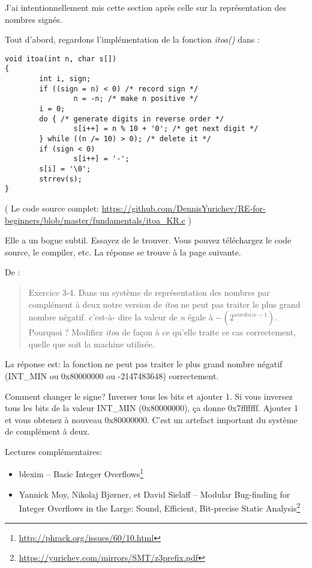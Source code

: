 
J'ai intentionnellement mis cette section après celle sur la représentation des nombres
signés.

Tout d'abord, regardons l'implémentation de la fonction  \emph{itoa()} dans \InSqBrackets{\KRBook}:

\begin{lstlisting}[style=customc]
void itoa(int n, char s[])
{
        int i, sign;
        if ((sign = n) < 0) /* record sign */
                n = -n; /* make n positive */
        i = 0;
        do { /* generate digits in reverse order */
                s[i++] = n % 10 + '0'; /* get next digit */
        } while ((n /= 10) > 0); /* delete it */
        if (sign < 0)
                s[i++] = '-';
        s[i] = '\0';
        strrev(s);
}
\end{lstlisting}

( Le code source complet: \url{https://github.com/DennisYurichev/RE-for-beginners/blob/master/fundamentals/itoa_KR.c} )

Elle a un bogue subtil. Essayez de le trouver. Vous pouvez téléchargez le code source,
le compiler, etc.
La réponse se trouve à la page suivante.

\clearpage

De \InSqBrackets{\KRBook}:

\begin{framed}
\begin{quotation}
Exercice 3-4. Dans un système de représentation des nombres par complément à deux
notre version de \emph{itoa} ne peut pas traiter le plus grand nombre négatif. c'est-à-
dire la valeur de \emph{n} égale à $-(2^{wordsize-1})$. Pourquoi ? Modifiez \emph{itoa}
de façon à ce qu'elle traite ce cas correctement, quelle que soit la machine utilisée.
\end{quotation}
\end{framed}

La réponse est: la fonction ne peut pas traiter le plus grand nombre négatif (INT\_MIN
ou 0x80000000 ou -2147483648) correctement.

Comment changer le signe? Inverser tous les bits et ajouter 1.
Si vous inversez tous les bits de la valeur INT\_MIN (0x80000000), ça donne 0x7fffffff.
Ajouter 1 et vous obtenez à nouveau 0x80000000.
C'est un artefact important du système de complément à deux.

Lectures  complémentaires:

\begin{itemize}
\item blexim -- Basic Integer Overflows\footnote{\url{http://phrack.org/issues/60/10.html}}

\item Yannick Moy, Nikolaj Bjørner, et David Sielaff -- Modular Bug-finding for Integer Overflows in the Large: Sound, Efficient, Bit-precise Static Analysis\footnote{\url{https://yurichev.com/mirrors/SMT/z3prefix.pdf}}
\end{itemize}

